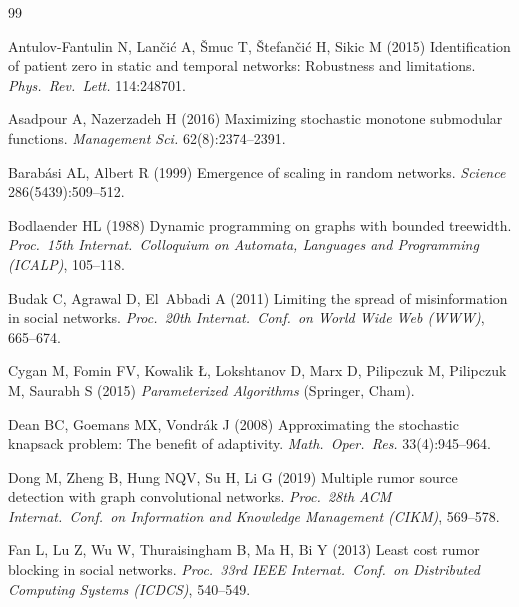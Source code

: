 \documentclass[ijoc,sglanonrev]{informs4}
\def\bibsep{\smallskipamount}%
\begin{document}
\setlength{\bibsep}{0pt}
\begin{thebibliography}{99}
\providecommand{\natexlab}[1]{#1}
\providecommand{\url}[1]{\texttt{#1}}
\providecommand{\urlprefix}{URL }

Antulov-Fantulin N, Lan\v{c}i\'c A, \v{S}muc T, \v{S}tefan\v{c}i\'c H,
  Sikic M (2015) Identification of patient zero in static and temporal
  networks: Robustness and limitations. \emph{Phys.\ Rev.\ Lett.}
  114:248701.

Asadpour A, Nazerzadeh H (2016) Maximizing stochastic monotone submodular
  functions. \emph{Management Sci.} 62(8):2374--2391.

Barab\'asi AL, Albert R (1999) Emergence of scaling in random networks.
  \emph{Science} 286(5439):509--512.

Bodlaender HL (1988) Dynamic programming on graphs with bounded treewidth.
  \emph{Proc.\ 15th Internat.\ Colloquium on Automata, Languages and
  Programming (ICALP)}, 105--118.

Budak C, Agrawal D, El~Abbadi A (2011) Limiting the spread of misinformation
  in social networks. \emph{Proc.\ 20th Internat.\ Conf.\ on World Wide Web
  (WWW)}, 665--674.

Cygan M, Fomin FV, Kowalik {\L}, Lokshtanov D, Marx D, Pilipczuk M,
  Pilipczuk M, Saurabh S (2015) \emph{Parameterized Algorithms} (Springer,
  Cham).

Dean BC, Goemans MX, Vondr\'ak J (2008) Approximating the stochastic
  knapsack problem: The benefit of adaptivity. \emph{Math.\ Oper.\ Res.}
  33(4):945--964.

Dong M, Zheng B, Hung NQV, Su H, Li G (2019) Multiple rumor source detection
  with graph convolutional networks. \emph{Proc.\ 28th ACM Internat.\
  Conf.\ on Information and Knowledge Management (CIKM)}, 569--578.

Fan L, Lu Z, Wu W, Thuraisingham B, Ma H, Bi Y (2013) Least cost rumor
  blocking in social networks. \emph{Proc.\ 33rd IEEE Internat.\ Conf.\ on
  Distributed Computing Systems (ICDCS)}, 540--549.


\end{thebibliography}
\end{document}
